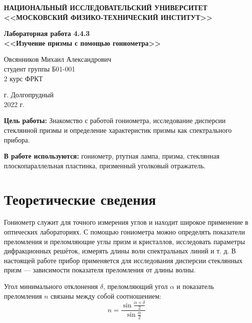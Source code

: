 \documentclass[a4paper,12pt]{article} %
\begin{document}
	
	
	\begin{center}
		
		
		\textbf{НАЦИОНАЛЬНЫЙ ИССЛЕДОВАТЕЛЬСКИЙ УНИВЕРСИТЕТ \\ <<МОСКОВСКИЙ ФИЗИКО-ТЕХНИЧЕСКИЙ ИНСТИТУТ>>}
		\vspace{13ex}
		
		\textbf{Лабораторная работа 4.4.3\\ <<Изучение призмы с помощью гониометра>>}
		\vspace{40ex}
		
		\normalsize{Овсянников Михаил Александрович \\ студент группы Б01-001\\ 2 курс ФРКТ\\}
	\end{center}
	
	\vfill 
	
	\begin{center}
		г. Долгопрудный\\ 
		2022 г.
	\end{center}
	
	
	\thispagestyle{empty} %
	\newpage
	
	
	\textbf{Цель работы:} Знакомство с работой гониометра, исследование дисперсии стеклянной призмы и определение характеристик призмы как спектрального прибора.
	
	
	\textbf{В работе используются:} гониометр, ртутная лампа, призма, стеклянная плоскопараллельная пластинка, призменный уголковый отражатель.
	
	\section*{Теоретические сведения}
	Гониометр служит для точного измерения углов и находит широкое применение в оптических лабораториях. С помощью гониометра можно определять показатели преломления и преломляющие углы призм и кристаллов, исследовать параметры дифракционных решёток, измерять длины волн спектральных линий и т. д. В настоящей работе прибор применяется для исследования дисперсии стеклянных призм — зависимости показателя преломления от длины волны.
	
	Угол минимального отклонения $\delta$, преломляющий угол $\alpha$ и показатель преломления $n$ связаны между собой соотношением:
	\begin{equation*}
		n = \frac{\sin{\frac{\alpha + \delta}{2}}}{\sin{\frac{\alpha}{2}}}
	\end{equation*}
\end{document}
